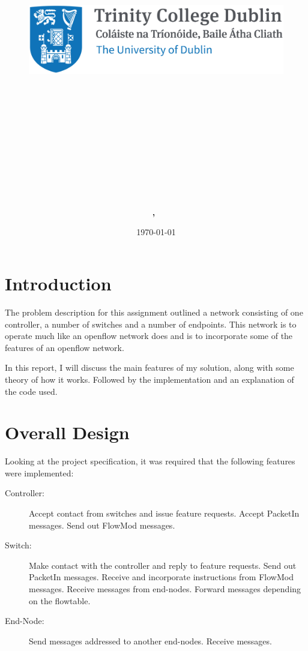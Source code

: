 \documentclass{article}
\title{
\vspace{-1in}
\begin{figure}[!ht]
\flushleft
\includegraphics[width=0.4\linewidth]{reduced-trinity.png}
\end{figure}
\vspace{-0.5cm}
\hrulefill \\
\vspace{0.5cm}
\textmd{\textbf{\moduleCode\ \moduleName}}\\
\textmd{\textbf{\assignmentTitle}}\\
\vspace{0.5cm}
\hrulefill \\
}
\author{\textbf{\authorName,\ \authorID}}
\date{\today}
\begin{document}
\captionsetup{width=.8\linewidth} 

\maketitle
\tableofcontents
\vspace{0.5in}

\pagebreak
\section{Introduction}


The problem description for this assignment outlined a network consisting of one controller, a number of switches and a number of endpoints. This network is to operate much like an openflow network does and is to incorporate some of the features of an openflow network.

In this report, I will discuss the main features of my solution, along with some theory of how it works. Followed by the implementation and an explanation of the code used.


\section{Overall Design}


Looking at the project specification, it was required that the following features were implemented:

\begin{description}
	\item [Controller:] Accept contact from switches and issue feature requests. Accept PacketIn messages. Send out FlowMod messages.
	\item [Switch:] Make contact with the controller and reply to feature requests. Send out PacketIn messages. Receive and incorporate instructions from FlowMod messages. Receive messages from end-nodes. Forward messages depending on the flowtable.
	\item [End-Node:] Send messages addressed to another end-nodes. Receive messages.
\end{description}
\end{document}
